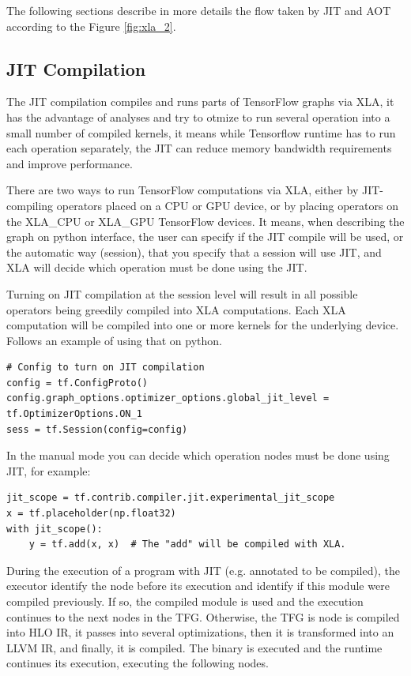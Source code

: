 \documentclass[11pt, fleqn]{article}
\begin{document}
The following sections describe in more details the flow taken by JIT and AOT according to the Figure \ref{fig:xla_2}.

\subsection{JIT Compilation}

The JIT compilation compiles and runs parts of TensorFlow graphs via XLA, it has the advantage of analyses and try to otmize to run several operation into a small number of compiled kernels, it means while Tensorflow runtime has to run each operation separately, the JIT can reduce memory bandwidth requirements and improve performance.

There are two ways to run TensorFlow computations via XLA, either by JIT-compiling operators placed on a CPU or GPU device, or by placing operators on the XLA\_CPU or XLA\_GPU TensorFlow devices. It means, when describing the graph on python interface, the user can specify if the JIT compile will be used, or the automatic way (session), that you specify that a session will use JIT, and XLA will decide which operation must be done using the JIT.

Turning on JIT compilation at the session level will result in all possible operators being greedily compiled into XLA computations. Each XLA computation will be compiled into one or more kernels for the underlying device. Follows an example of using that on python.

\begin{verbatim}
# Config to turn on JIT compilation
config = tf.ConfigProto()
config.graph_options.optimizer_options.global_jit_level = tf.OptimizerOptions.ON_1
sess = tf.Session(config=config)
\end{verbatim}

In the manual mode you can decide which operation nodes must be done using JIT, for example:

\begin{verbatim}
jit_scope = tf.contrib.compiler.jit.experimental_jit_scope
x = tf.placeholder(np.float32)
with jit_scope():
    y = tf.add(x, x)  # The "add" will be compiled with XLA.
\end{verbatim}


During the execution of a program with JIT (e.g. annotated to be compiled), the executor identify the node before its execution and identify if this module were compiled previously. If so, the compiled module is used and the execution continues to the next nodes in the TFG. Otherwise, the TFG is node is compiled into HLO IR, it passes into several optimizations, then it is transformed into an LLVM IR, and finally, it is compiled. The binary is executed and the runtime continues its execution, executing the following nodes.
\end{document}
